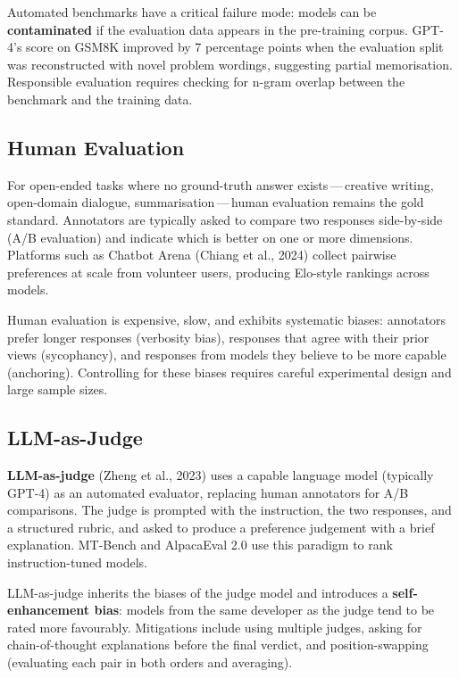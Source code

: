 Automated benchmarks have a critical failure mode: models can be \textbf{contaminated} if the evaluation data appears in the pre-training corpus. GPT-4's score on GSM8K improved by 7 percentage points when the evaluation split was reconstructed with novel problem wordings, suggesting partial memorisation. Responsible evaluation requires checking for n-gram overlap between the benchmark and the training data.

\subsection{Human Evaluation}

For open-ended tasks where no ground-truth answer exists\,---\,creative writing, open-domain dialogue, summarisation\,---\,human evaluation remains the gold standard. Annotators are typically asked to compare two responses side-by-side (A/B evaluation) and indicate which is better on one or more dimensions. Platforms such as Chatbot Arena (Chiang et al., 2024) collect pairwise preferences at scale from volunteer users, producing Elo-style rankings across models.

Human evaluation is expensive, slow, and exhibits systematic biases: annotators prefer longer responses (verbosity bias), responses that agree with their prior views (sycophancy), and responses from models they believe to be more capable (anchoring). Controlling for these biases requires careful experimental design and large sample sizes.

\subsection{LLM-as-Judge}

\textbf{LLM-as-judge} (Zheng et al., 2023) uses a capable language model (typically GPT-4) as an automated evaluator, replacing human annotators for A/B comparisons. The judge is prompted with the instruction, the two responses, and a structured rubric, and asked to produce a preference judgement with a brief explanation. MT-Bench and AlpacaEval 2.0 use this paradigm to rank instruction-tuned models.

LLM-as-judge inherits the biases of the judge model and introduces a \textbf{self-enhancement bias}: models from the same developer as the judge tend to be rated more favourably. Mitigations include using multiple judges, asking for chain-of-thought explanations before the final verdict, and position-swapping (evaluating each pair in both orders and averaging).

